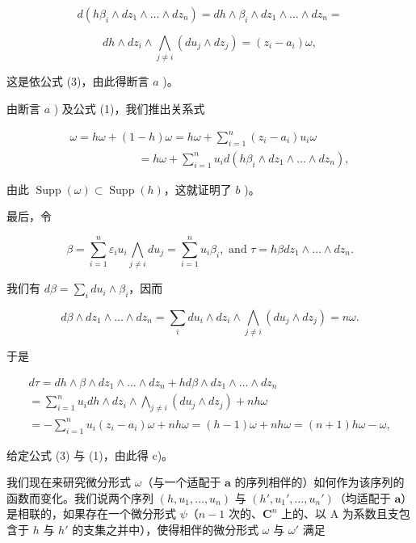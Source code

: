 \[
d \left(h \beta_ {i} \wedge d z _ {1} \wedge \dots \wedge d z _ {n}\right) = d h \wedge \beta_ {i} \wedge d z _ {1} \wedge \dots \wedge d z _ {n} =
\]

\[
d h \wedge d z _ {i} \wedge \bigwedge_ {j \neq i} (d u _ {j} \wedge d z _ {j}) = (z _ {i} - a _ {i}) \omega ,
\]

这是依公式 (3)，由此得断言 \(a\) )。

由断言 \(a\) ) 及公式 (1)，我们推出关系式

\[
\begin{array}{l} \omega = h \omega + (1 - h) \omega = h \omega + \sum_ {i = 1} ^ {n} (z _ {i} - a _ {i}) u _ {i} \omega \\ \qquad \qquad \qquad = h \omega + \sum_ {i = 1} ^ {n} u _ {i}   d (h \beta_ {i} \wedge d z _ {1} \wedge \dots \wedge d z _ {n}), \end{array}
\]

由此 \(\operatorname{Supp}(\omega) \subset \operatorname{Supp}(h)\)，这就证明了 \(b\) )。

最后，令

\[
\beta = \sum_ {i = 1} ^ {n} \varepsilon_ {i} u _ {i} \bigwedge_ {j \neq i} d u _ {j} = \sum_ {i = 1} ^ {n} u _ {i} \beta_ {i}, \text {   and   } \tau = h \beta d z _ {1} \wedge \dots \wedge d z _ {n}.
\]

我们有 \(d\beta = \sum_{i}du_{i}\wedge \beta_{i}\)，因而

\[
d \beta \wedge d z _ {1} \wedge \dots \wedge d z _ {n} = \sum_ {i} d u _ {i} \wedge d z _ {i} \wedge \bigwedge_ {j \neq i} (d u _ {j} \wedge d z _ {j}) = n \omega .
\]

于是

\[
\begin{array}{l} d \tau = d h \wedge \beta \wedge d z _ {1} \wedge \dots \wedge d z _ {n} + h d \beta \wedge d z _ {1} \wedge \dots \wedge d z _ {n} \\ = \sum_ {i = 1} ^ {n} u _ {i} d h \wedge d z _ {i} \wedge \bigwedge_ {j \neq i} (d u _ {j} \wedge d z _ {j}) + n h \omega \\ = - \sum_ {i = 1} ^ {n} u _ {i} (z _ {i} - a _ {i}) \omega + n h \omega = (h - 1) \omega + n h \omega = (n + 1) h \omega - \omega , \end{array}
\]

给定公式 (3) 与 (1)，由此得 c)。

我们现在来研究微分形式 \(\omega\)（与一个适配于 \(\boldsymbol{a}\) 的序列相伴的）如何作为该序列的函数而变化。我们说两个序列 \((h, u_1, \ldots, u_n)\) 与 \((h', u_1', \ldots, u_n')\)（均适配于 \(\boldsymbol{a}\)）是相联的，如果存在一个微分形式 \(\psi\)（\(n-1\) 次的、\(\mathbf{C}^n\) 上的、以 A 为系数且支包含于 \(h\) 与 \(h'\) 的支集之并中），使得相伴的微分形式 \(\omega\) 与 \(\omega'\) 满足

